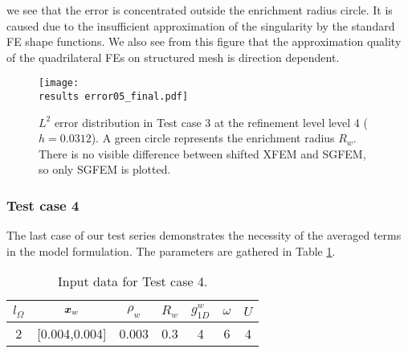 we see that the error is concentrated outside the enrichment radius circle. It is caused due to the insufficient approximation of the singularity
by the standard FE shape functions. We also see from this figure that the approximation quality of the quadrilateral FEs on structured mesh is direction dependent.
%
\begin{figure}[!htb]
  \centering    
  \texttt{[image: \\results error05\_final.pdf]}
  \caption[Error distribution in Test case 3]{$L^2$ error distribution in Test case 3 at the refinement level level 4 ($h=0.0312$).
  A green circle represents the enrichment radius $R_w$. There is no visible difference between shifted XFEM and SGFEM, so only SGFEM is plotted.}
  \label{fig:error_distribution_test3}
\end{figure}
%

\subsubsection{Test case 4}
The last case of our test series demonstrates the necessity of the averaged terms in the model formulation.
The parameters are gathered in Table \ref{tab:test_case_4_data}.
%
\begin{table}[!htb]
\begin{center}
\begin{tabular}{ccccccc}
\toprule
$l_\Omega$ & $\mathbf{\boldsymbol{x}}_w$  & $\rho_w$ & $R_w$ & $g^w_{1D}$ & $\omega$ & $U$ \\
\midrule
2 & [0.004,0.004] & 0.003 & 0.3 & 4 & 6 & 4\\
\bottomrule
\end{tabular}
\caption{Input data for Test case 4.}
\label{tab:test_case_4_data}
\end{center}
\end{table}
%

